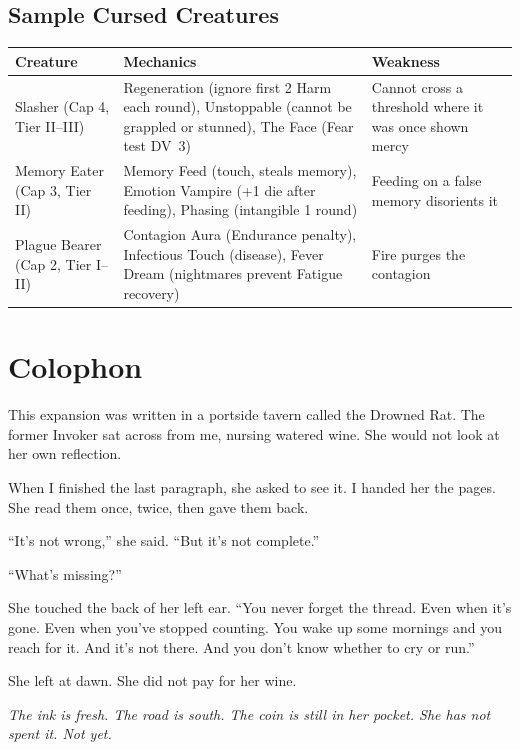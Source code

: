 \documentclass[10pt,twoside]{book}
\newcommand{\dv}[1]{\textsc{DV}~#1}
\begin{document}
\section{Sample Cursed Creatures}

\begin{tabular}{@{}p{}p{}p{}@{}}
\toprule
\textbf{Creature} & \textbf{Mechanics} & \textbf{Weakness} \\
\midrule
Slasher (Cap 4, Tier II--III) & Regeneration (ignore first 2 Harm each round), Unstoppable (cannot be grappled or stunned), The Face (Fear test \dv{3}) & Cannot cross a threshold where it was once shown mercy \\
Memory Eater (Cap 3, Tier II) & Memory Feed (touch, steals memory), Emotion Vampire (+1 die after feeding), Phasing (intangible 1 round) & Feeding on a false memory disorients it \\
Plague Bearer (Cap 2, Tier I--II) & Contagion Aura (Endurance penalty), Infectious Touch (disease), Fever Dream (nightmares prevent Fatigue recovery) & Fire purges the contagion \\
\bottomrule
\end{tabular}

\chapter{Colophon}

This expansion was written in a portside tavern called the Drowned Rat. The former Invoker sat across from me, nursing watered wine. She would not look at her own reflection.

When I finished the last paragraph, she asked to see it. I handed her the pages. She read them once, twice, then gave them back.

``It's not wrong,'' she said. ``But it's not complete.''

``What's missing?''

She touched the back of her left ear. ``You never forget the thread. Even when it's gone. Even when you've stopped counting. You wake up some mornings and you reach for it. And it's not there. And you don't know whether to cry or run.''

She left at dawn. She did not pay for her wine.

\vspace{0.5cm}
\noindent
\textit{The ink is fresh. The road is south. The coin is still in her pocket. She has not spent it. Not yet.}
\end{document}
